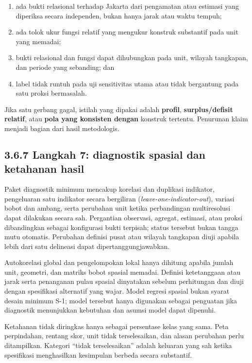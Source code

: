\documentclass[
  indonesian,
  11pt,
  a4paper,
  oneside,
  openany]{report}
\providecommand{\tightlist}{%
  \setlength{\itemsep}{0pt}\setlength{\parskip}{0pt}}
\begin{document}
\begin{enumerate}
\def\labelenumi{\arabic{enumi}.}
\tightlist
\item
  ada bukti relasional terhadap Jakarta dari pengamatan atau estimasi
  yang diperiksa secara independen, bukan hanya jarak atau waktu tempuh;
\item
  ada tolok ukur fungsi relatif yang mengukur konstruk substantif pada
  unit yang memadai;
\item
  bukti relasional dan fungsi dapat dihubungkan pada unit, wilayah
  tangkapan, dan periode yang sebanding; dan
\item
  label tidak runtuh pada uji sensitivitas utama atau tidak bergantung
  pada satu proksi bermasalah.
\end{enumerate}

Jika satu gerbang gagal, istilah yang dipakai adalah \textbf{profil},
\textbf{surplus/defisit relatif}, atau \textbf{pola yang konsisten
dengan} konstruk tertentu. Penurunan klaim menjadi bagian dari hasil
metodologis.

\subsection{3.6.7 Langkah 7: diagnostik spasial dan ketahanan
hasil}\label{langkah-7-diagnostik-spasial-dan-ketahanan-hasil}

Paket diagnostik minimum mencakup korelasi dan duplikasi indikator,
pengeluaran satu indikator secara bergiliran
(\emph{leave-one-indicator-out}), variasi bobot dan ambang, serta
perubahan unit ketika perbandingan multiresolusi dapat dilakukan secara
sah. Pergantian observasi, agregat, estimasi, atau proksi dibandingkan
sebagai konfigurasi bukti terpisah; status tersebut bukan tangga mutu
otomatis. Perubahan definisi pusat atau wilayah tangkapan diuji apabila
lebih dari satu delineasi dapat dipertanggungjawabkan.

Autokorelasi global dan pengelompokan lokal hanya dihitung apabila
jumlah unit, geometri, dan matriks bobot spasial memadai. Definisi
ketetanggaan atau jarak serta penanganan pulau spasial dinyatakan
sebelum perhitungan dan diuji dengan spesifikasi alternatif yang wajar.
Model regresi spasial bukan syarat desain minimum S-1; model tersebut
hanya digunakan sebagai penguatan jika diagnostik menunjukkan kebutuhan
dan asumsi model dapat dipenuhi.

Ketahanan tidak diringkas hanya sebagai persentase kelas yang sama. Peta
perpindahan, rentang skor, unit tidak terselesaikan, dan alasan
perubahan perlu ditampilkan. Kategori ``tidak terselesaikan'' adalah
keluaran yang sah ketika spesifikasi menghasilkan kesimpulan berbeda
secara substantif.
\end{document}
